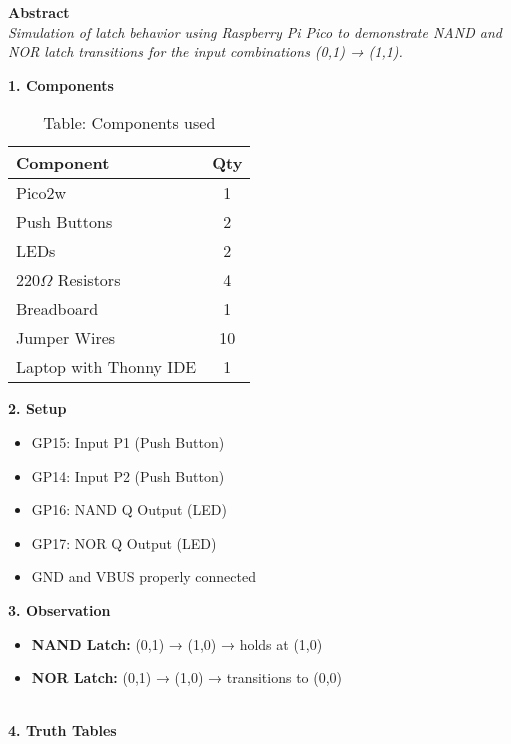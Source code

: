\documentclass[12pt]{article}
\begin{document}
\begin{multicols}{2}

\noindent\textbf{Abstract} \\[0.5em]
\textit{Simulation of latch behavior using Raspberry Pi Pico to demonstrate NAND and NOR latch transitions for the input combinations (0,1) → (1,1).}

\vspace{1em}
\noindent\textbf{1. Components}
\begin{table}[H]
\small
\centering
\begin{tabular}{|p{4.2cm}|c|}
\hline
\textbf{Component} & \textbf{Qty} \\
\hline
 Pico2w & 1 \\
Push Buttons & 2 \\
LEDs & 2 \\
220$\Omega$ Resistors & 4 \\
Breadboard & 1 \\
Jumper Wires & 10 \\
Laptop with Thonny IDE & 1 \\
\hline
\end{tabular}
\caption*{Table: Components used}
\end{table}

\vspace{1em}
\noindent\textbf{2. Setup}
\begin{itemize}
    \item GP15: Input P1 (Push Button)
    \item GP14: Input P2 (Push Button)
    \item GP16: NAND Q Output (LED)
    \item GP17: NOR Q Output (LED)
    \item GND and VBUS properly connected
\end{itemize}

\vspace{1em}
\noindent\textbf{3. Observation}
\begin{itemize}
    \item \textbf{NAND Latch:} (0,1) → (1,0) → holds at (1,0)
    \item \textbf{NOR Latch:} (0,1) → (1,0) → transitions to (0,0)
\end{itemize}

\end{multicols}
\\
\noindent\textbf{4. Truth Tables}\\
\\
\\
\end{document}
